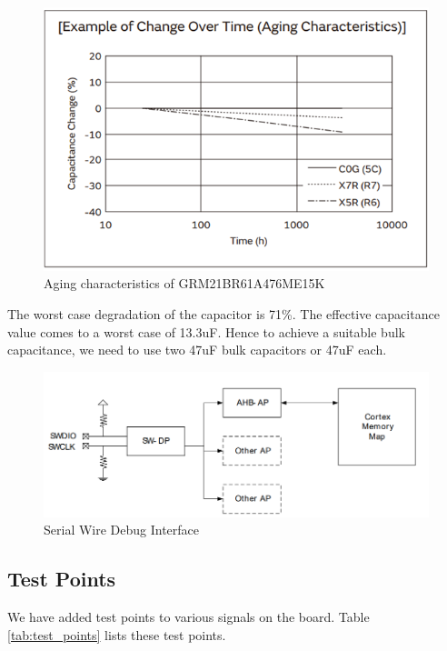 \documentclass[a4paper,11pt]{article}%
\begin{document}
    \begin{figure}[H]
        \centering
        \includegraphics[width=\textwidth]{figures/Update5/Aging characteristics of capacitor.png}
        \caption{Aging characteristics of GRM21BR61A476ME15K}
    \end{figure}

    The worst case degradation of the capacitor is 71\%. The effective capacitance value comes to a worst case of 13.3uF.
    Hence to achieve a suitable bulk capacitance, we need to use two 47uF bulk capacitors or 47uF each. 

\begin{figure}[H]
    \centering
    \includegraphics[width=\textwidth]{figures/serial_wire.png}
    \caption{Serial Wire Debug Interface}
\end{figure}


\subsection{Test Points}

We have added test points to various signals on the board. Table \ref{tab:test_points} lists these test points.
\end{document}
